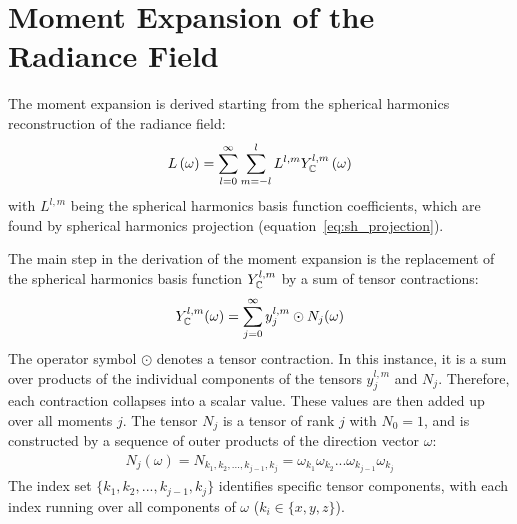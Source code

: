 \section{Moment Expansion of the Radiance Field}
\label{sec:da_moment_expansion_L}


The moment expansion is derived starting from the spherical harmonics reconstruction of the radiance field:
\begin{align}
\label{eq:fld_moment_expansion_sh_expansion}
L\left(\omega\right) =
\sum_{l=0}^{\infty}\sum_{m=-l}^{l}L^{l,m}Y_{\mathbb{C}}^{l,m}
\left(\omega\right)
\end{align}
with $L^{l,m}$ being the spherical harmonics basis function coefficients, which are found by spherical harmonics projection (equation~\ref{eq:sh_projection}).

The main step in the derivation of the moment expansion is the replacement of the spherical harmonics basis function $Y_{\mathbb{C}}^{l,m}$ by a sum of tensor contractions:
\begin{align}
\label{eq:fld_moment_expansion_sum}
Y_{\mathbb{C}}^{l,m}(\omega) =
\sum_{j=0}^\infty{y^{l,m}_j\odot N_j(\omega)}
\end{align}
The operator symbol $\odot$ denotes a tensor contraction. In this instance, it is a sum over products of the individual components of the tensors $y^{l,m}_j$ and $N_j$. Therefore, each contraction collapses into a scalar value. These values are then added up over all moments $j$. The tensor $N_j$ is a tensor of rank $j$ with $N_0=1$, and is constructed by a sequence of outer products of the direction vector $\omega$:
\begin{align}
N_j\left(\omega\right)
=N_{k_1, k_2, ..., k_{j-1}, k_j} 
=\omega_{k_1}\omega_{k_2}...\omega_{k_{j-1}}\omega_{k_j} 
\end{align}
The index set $\{k_1, k_2, ..., k_{j-1}, k_j\}$ identifies specific tensor components, with each index running over all components of $\omega$ ($k_i \in \{x, y, z\}$).

